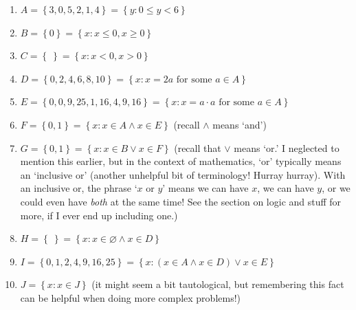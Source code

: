 \documentclass[10pt]{article}
\theoremstyle{definition}
\newcommand{\set}[1]{\left\{ #1 \right\}}
\begin{document}
\begin{enumerate}
    \item $A = \set{3,0,5,2,1,4} = \set{y:0\leq y<6}$
    \item $B = \set{0} = \set{x:x\leq 0, x\geq 0}$
    \item $C = \set{~} = \set{x:x<0,x>0}$
    \item $D = \set{0,2,4,6,8,10} = \set{x:x=2a\text{ for some }a\in A}$
    \item $E = \set{0,0,9,25,1,16,4,9,16} = \set{x:x=a\cdot a \text{ for some }a\in A}$
    \item $F = \set{0,1} = \set{x:x\in A \land x\in E}$ (recall $\land$ means `and')
    \item $G = \set{0,1} = \set{x:x\in B \lor x\in F}$ (recall that $\lor$ means `or.'  I neglected to mention this earlier, but in the context of mathematics, `or' typically means an `inclusive or' (another unhelpful bit of terminology! Hurray hurray).  With an inclusive or, the phrase `$x$ or $y$' means we can have $x$, we can have $y$, or we could even have \emph{both} at the same time!  See the section on logic and stuff for more, if I ever end up including one.)
    \item $H = \set{~} = \set{x:x\in \varnothing\land x\in D}$
    \item $I = \set{0,1,2,4,9,16,25} = \set{x:(x\in A\land x\in D)\lor x\in E}$ 
    \item $J = \set{x:x\in J}$ (it might seem a bit tautological, but remembering this fact can be helpful when doing more complex problems!)
\end{enumerate}
\end{document}
